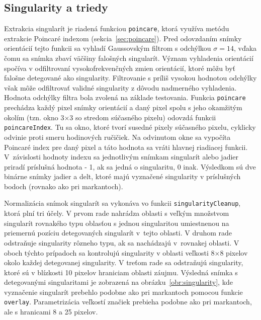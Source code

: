   \subsection{Singularity a triedy} \label{sec:singul_a_triedy}
  Extrakcia singularít je riadená funkciou \texttt{poincare}, ktorá využíva metódu extrakcie Poincaré indexom (sekcia~{\ref{sec:poincare}}). Pred odovzdaním
  snímky orientácií tejto funkcii sa vyhladí Gaussovským filtrom s odchýlkou $\sigma = 14$, vďaka čomu sa snímka zbaví väčšiny falošných singularít.
  Význam vyhladenia orientácií spočíva v odfiltrovaní vysokofrekvenčných zmien orientácií, ktoré môžu byť falošne detegované ako singularity. Filtrovanie
  s príliš vysokou hodnotou odchýlky však môže odfiltrovať validné singularity z dôvodu nadmerného vyhladenia. Hodnota odchýlky filtra bola zvolená na
  základe testovania.
  Funkcia \texttt{poincare} prechádza každý pixel snímky orientácií
  a daný pixel spolu s jeho okamžitým okolím (tzn. okno $3$$\times{}$$3$ so stredom súčasného pixelu) odovzdá funkcii \texttt{poincareIndex}. Tu sa okno,
  ktoré tvorí susedné pixely súčasného pixelu, cyklicky odvinie
  proti smeru hodinových ručičiek. Na odvinutom okne sa vypočíta Poincaré index pre daný pixel a táto hodnota sa vráti hlavnej riadiacej funkcii.
  V~závislosti hodnoty indexu sa jednotlivým snímkam singularít alebo jadier priradí príslušná hodnota - 1, ak sa jedná o singularitu, 0 inak.
  Výsledkom sú dve binárne snímky jadier a delt, ktoré majú vyznačené singularity v príslušných bodoch (rovnako ako pri markantoch).
  
  Normalizácia snímok singularít sa vykonáva vo funkcii \texttt{singularityCleanup}, ktorá plní tri účely. V prvom rade nahrádza oblasti s veľkým
  množstvom singularít rovnakého typu oblasťou s jednou singularitou umiestnenou na priemernú pozíciu detegovaných singularít v~tejto oblasti.
  V druhom rade odstraňuje singularity rôzneho typu, ak sa nachádzajú v~rovnakej oblasti. V oboch týchto
  prípadoch sa kontrolujú singularity v oblasti veľkosti $8$$\times{}$$8$ pixelov okolo každej detegovanej singularity. V treťom rade sa odstraňujú singularity,
  ktoré sú v blízkosti 10 pixelov hraniciam oblasti záujmu. Výsledná snímka s detegovanými singularitami je zobrazená na
  obrázku~{\ref{obr:singularity}}, kde vyznačenie singularít prebehlo podobne ako pri markantoch pomocou funkcie \texttt{overlay}. Parametrizácia veľkostí
  značiek prebieha podobne ako pri markantoch, ale s hranicami 8 a 25 pixelov.

